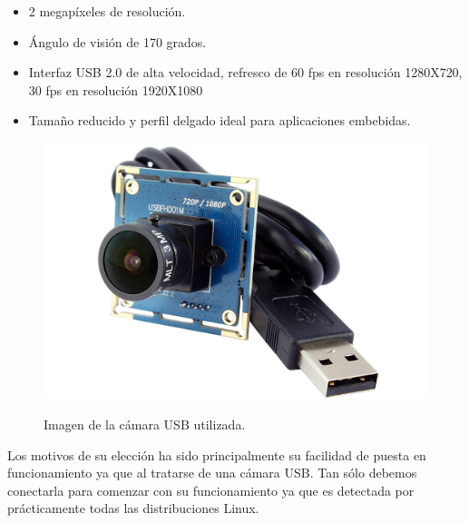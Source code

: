 \begin{itemize}
\item 2 megapíxeles de resolución.
\item Ángulo de visión de 170 grados.
\item Interfaz USB 2.0 de alta velocidad, refresco de 60 fps en resolución 1280X720, 30 fps en resolución 1920X1080
\item Tamaño reducido y perfil delgado ideal para aplicaciones embebidas.
\end{itemize}

\begin{figure}[H]
  \begin{center}
    \includegraphics[scale=0.15]{imagenes/robot/camara-usb.jpg}\\
    \caption{Imagen de la cámara USB utilizada.}
  \end{center}
\end{figure}

Los motivos de su elección ha sido principalmente su facilidad de puesta en funcionamiento ya que al tratarse de una cámara USB. Tan sólo debemos conectarla para comenzar con su funcionamiento ya que es detectada 
por prácticamente todas las distribuciones Linux. 